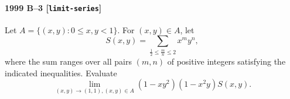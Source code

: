 \paragraph{1999 B--3 \textnormal{[\texttt{limit-series}]}}
Let $A=\{(x,y):0\leq x,y<1\}$. For $(x,y)\in A$, let
\[S(x,y) = \sum_{\frac{1}{2}\leq \frac{m}{n}\leq 2} x^m y^n,\]
where the sum ranges over all pairs $(m,n)$ of positive integers
satisfying the indicated inequalities. Evaluate
\[\lim_{(x,y)\rightarrow (1,1), (x,y)\in A} (1-xy^2)(1-x^2y)S(x,y).\]

